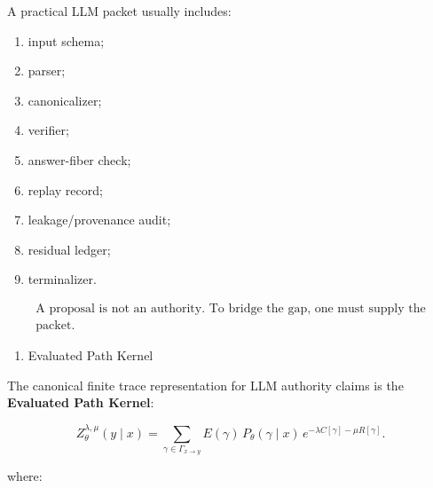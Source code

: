 \documentclass[
  10pt,
]{article}
\providecommand{\tightlist}{%
  \setlength{\itemsep}{0pt}\setlength{\parskip}{0pt}}
\providecommand{\tightlist}{%
  \setlength{\itemsep}{0pt}\setlength{\parskip}{0pt}}
\begin{document}
A practical LLM packet usually includes:

\begin{enumerate}
\def\labelenumi{\arabic{enumi}.}
\tightlist
\item
  input schema;
\item
  parser;
\item
  canonicalizer;
\item
  verifier;
\item
  answer-fiber check;
\item
  replay record;
\item
  leakage/provenance audit;
\item
  residual ledger;
\item
  terminalizer.
\end{enumerate}

\protect\hypertarget{math-E0030-0038}{}{\[
\boxed{
\begin{gathered}\text{A proposal is not an authority. To bridge the gap, one must supply the}\\
\text{packet.}\end{gathered}
}
\]}

\begin{enumerate}
\def\labelenumi{\arabic{enumi}.}
\setcounter{enumi}{3}
\tightlist
\item
  Evaluated Path Kernel
\end{enumerate}

The canonical finite trace representation for LLM authority claims is the \textbf{Evaluated Path Kernel}:

\protect\hypertarget{math-E0031-0039}{}{\[
\boxed{
Z_\theta^{\lambda,\mu}(y\mid x) =
\sum_{\gamma\in\Gamma_{x\to y}}
E(\gamma)\,
P_\theta(\gamma\mid x)\,
e^{-\lambda C[\gamma]-\mu R[\gamma]}.
}
\]}

where:
\end{document}
